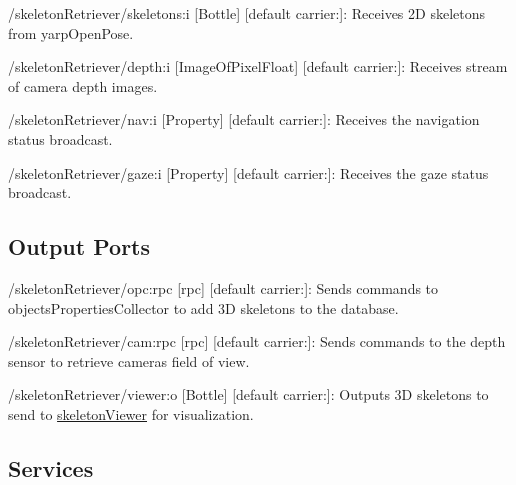 \begin{DoxyItemize}
\item /skeleton\+Retriever/skeletons\+:i \mbox{[}Bottle\mbox{]} \mbox{[}default carrier\+:\mbox{]}\+: Receives 2D skeletons from yarp\+Open\+Pose.
\item /skeleton\+Retriever/depth\+:i \mbox{[}Image\+Of\+Pixel\+Float\mbox{]} \mbox{[}default carrier\+:\mbox{]}\+: Receives stream of camera depth images.
\item /skeleton\+Retriever/nav\+:i \mbox{[}Property\mbox{]} \mbox{[}default carrier\+:\mbox{]}\+: Receives the navigation status broadcast.
\item /skeleton\+Retriever/gaze\+:i \mbox{[}Property\mbox{]} \mbox{[}default carrier\+:\mbox{]}\+: Receives the gaze status broadcast.
\end{DoxyItemize}\hypertarget{group__skeletonViewer_outputports_sec}{}\subsection{Output Ports}\label{group__skeletonViewer_outputports_sec}

\begin{DoxyItemize}
\item /skeleton\+Retriever/opc\+:rpc \mbox{[}rpc\mbox{]} \mbox{[}default carrier\+:\mbox{]}\+: Sends commands to objects\+Properties\+Collector to add 3D skeletons to the database.
\item /skeleton\+Retriever/cam\+:rpc \mbox{[}rpc\mbox{]} \mbox{[}default carrier\+:\mbox{]}\+: Sends commands to the depth sensor to retrieve camera\textquotesingle{}s field of view.
\item /skeleton\+Retriever/viewer\+:o \mbox{[}Bottle\mbox{]} \mbox{[}default carrier\+:\mbox{]}\+: Outputs 3D skeletons to send to \hyperlink{group__skeletonViewer}{skeleton\+Viewer} for visualization.
\end{DoxyItemize}\hypertarget{group__skeletonViewer_services_sec}{}\subsection{Services}\label{group__skeletonViewer_services_sec}
